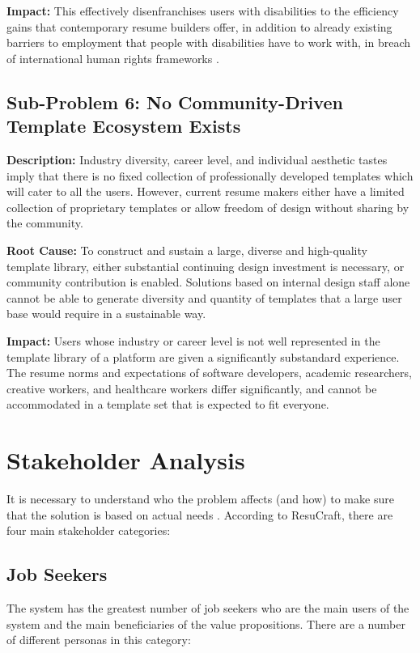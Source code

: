 \documentclass[12pt, a4paper, oneside]{report}
\begin{document}
\textbf{Impact:} This effectively disenfranchises users with disabilities to the efficiency gains that contemporary resume builders offer, in addition to already existing barriers to employment that people with disabilities have to work with, in breach of international human rights frameworks \cite{crpd2006}.

\subsection{Sub-Problem 6: No Community-Driven Template Ecosystem Exists}

\textbf{Description:} Industry diversity, career level, and individual aesthetic tastes imply that there is no fixed collection of professionally developed templates which will cater to all the users. However, current resume makers either have a limited collection of proprietary templates or allow freedom of design without sharing by the community.

\textbf{Root Cause:} To construct and sustain a large, diverse and high-quality template library, either substantial continuing design investment is necessary, or community contribution is enabled. Solutions based on internal design staff alone cannot be able to generate diversity and quantity of templates that a large user base would require in a sustainable way.

\textbf{Impact:} Users whose industry or career level is not well represented in the template library of a platform are given a significantly substandard experience. The resume norms and expectations of software developers, academic researchers, creative workers, and healthcare workers differ significantly, and cannot be accommodated in a template set that is expected to fit everyone.

\section{Stakeholder Analysis}

It is necessary to understand who the problem affects (and how) to make sure that the solution is based on actual needs \cite{pressman2014}. According to ResuCraft, there are four main stakeholder categories:

\subsection{Job Seekers}

The system has the greatest number of job seekers who are the main users of the system and the main beneficiaries of the value propositions. There are a number of different personas in this category:
\end{document}
